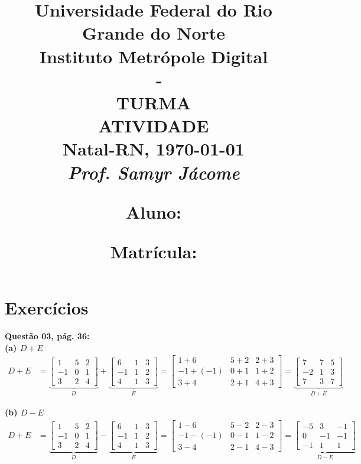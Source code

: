 \documentclass[a4paper,12pt]{article}
\author{}
\date{}
\title{
\vspace{-2cm}
\Large \textbf{Universidade Federal do Rio Grande do Norte}\\ 
Instituto Metrópole Digital \\ 
\coddisciplina $\;$ - \nomedisciplina \\ 
TURMA \codturma \\
\vspace{5mm} \Large\textbf{ATIVIDADE \codatividade} \\
\normalsize Natal-RN, \today\\
\vspace{0.7cm} \large \textit{Prof. Samyr Jácome}\\

\justifying
\vspace{0.5cm} \hspace{-0.82cm}
\begin{minipage}{.6\linewidth}
    \large \textbf{Aluno:} \nomedoaluno
\end{minipage}
\begin{minipage}{.4\linewidth}
    \begin{flushright}
        \large \textbf{Matrícula:} \matricula
    \end{flushright}
\end{minipage}
}
\def\tirarident{\setlength{\parindent}{0cm}} %
\begin{document}
\maketitle

\vspace{-2cm}
\section*{Exercícios}

\tirarident

\textbf{Questão 03, pág. 36:}\\

\textbf{(a) $D + E$}
\begin{align*}
    D + E &=
    \underbrace{
    \begin{bmatrix}
        1 & 5 & 2\\
        -1  & 0 & 1\\
        3 & 2 & 4
    \end{bmatrix}}_{D} +
    \underbrace{
    \begin{bmatrix}
        6 & 1 & 3\\
        -1 & 1  & 2\\
        4 & 1  & 3
    \end{bmatrix}}_{E} 
    =
    \begin{bmatrix}
            1+6 & 5+2 & 2+3\\
            -1+(-1)  & 0+1 &1+2\\
            3+4 & 2+1 & 4+3
    \end{bmatrix}
    =
    \underbrace{\begin{bmatrix}
        7 & 7 & 5\\
        -2 & 1 & 3\\
        7 & 3 & 7
    \end{bmatrix}}_{D + E}
\end{align*}
    
\textbf{(b) $D - E$}
\begin{align*}
    D + E &=
    \underbrace{
    \begin{bmatrix}
        1 & 5 & 2\\
        -1  & 0 & 1\\
        3 & 2 & 4
    \end{bmatrix}}_{D} -
    \underbrace{
    \begin{bmatrix}
        6 & 1 & 3\\
        -1 & 1  & 2\\
        4 & 1  & 3
    \end{bmatrix}}_{E} 
    =
    \begin{bmatrix}
            1-6 & 5-2 & 2-3\\
            -1-(-1)  & 0-1 &1-2\\
            3-4 & 2-1 & 4-3
    \end{bmatrix}
    =
    \underbrace{\begin{bmatrix}
        -5 & 3 & -1\\
        0 & -1 & -1\\
        -1 & 1 & 1
    \end{bmatrix}}_{D - E}
\end{align*}
\end{document}
